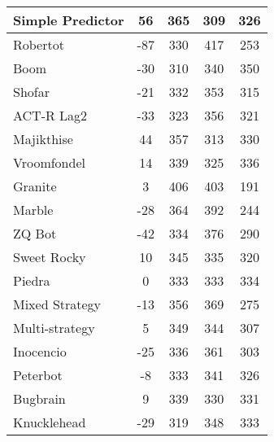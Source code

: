 \begin{table*}
\begin{tabular}{|l|c|c|c|c|}
Simple Predictor & 56 & 365 & 309 & 326 \\ \hline 
Robertot & -87 & 330 & 417 & 253 \\ \hline 
Boom & -30 & 310 & 340 & 350 \\ \hline 
Shofar & -21 & 332 & 353 & 315 \\ \hline 
ACT-R Lag2 & -33 & 323 & 356 & 321 \\ \hline 
Majikthise & 44 & 357 & 313 & 330 \\ \hline 
Vroomfondel & 14 & 339 & 325 & 336 \\ \hline 
Granite & 3 & 406 & 403 & 191 \\ \hline 
Marble & -28 & 364 & 392 & 244 \\ \hline 
ZQ Bot & -42 & 334 & 376 & 290 \\ \hline 
Sweet Rocky & 10 & 345 & 335 & 320 \\ \hline 
Piedra & 0 & 333 & 333 & 334 \\ \hline 
Mixed Strategy & -13 & 356 & 369 & 275 \\ \hline 
Multi-strategy & 5 & 349 & 344 & 307 \\ \hline 
Inocencio & -25 & 336 & 361 & 303 \\ \hline 
Peterbot & -8 & 333 & 341 & 326 \\ \hline 
Bugbrain & 9 & 339 & 330 & 331 \\ \hline 
Knucklehead & -29 & 319 & 348 & 333 \\ \hline
        \end{tabular}
    \end{table*}